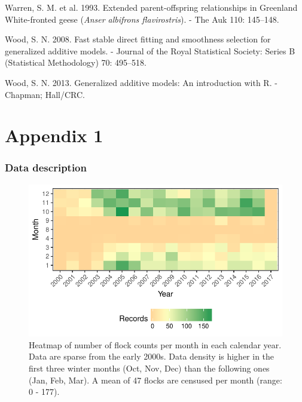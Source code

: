 \documentclass[10pt,twocolumn]{paper}
\begin{document}
\hypertarget{ref-10.2307ux2f4088245}{}
Warren, S. M. et al. 1993. Extended parent-offspring relationships in
Greenland White-fronted geese (\emph{Anser albifrons flavirostris}). -
The Auk 110: 145--148.

\hypertarget{ref-wood2008fast}{}
Wood, S. N. 2008. Fast stable direct fitting and smoothness selection
for generalized additive models. - Journal of the Royal Statistical
Society: Series B (Statistical Methodology) 70: 495--518.

\hypertarget{ref-wood2013gam}{}
Wood, S. N. 2013. Generalized additive models: An introduction with R. -
Chapman; Hall/CRC.

\normalsize

\clearpage

\setcounter{table}{0} \renewcommand{\thetable}{A\arabic{table}}

\renewcommand\thefigure{A\arabic{figure}}

\section{Appendix 1}\label{appendix-1}

\setcounter{figure}{0}

\subsubsection{Data description}\label{data-description}

\begin{figure}[H]
\includegraphics[width = 1.5\linewidth]{data_density.pdf}
\caption{{\small Heatmap of number of flock counts per month in each calendar year. Data are sparse from the early 2000s. Data density is higher in the first three winter months (Oct, Nov, Dec) than the following ones (Jan, Feb, Mar). A mean of 47 flocks are censused per month (range: 0 - 177).}}

\end{figure}
\end{document}
